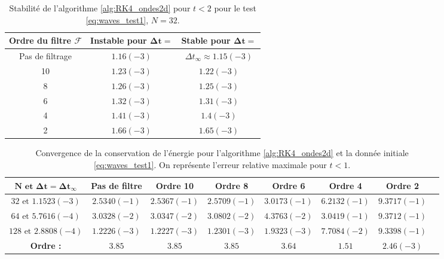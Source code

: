 \begin{table}[htbp]
\begin{center}
\begin{tabular}{|c||c|c|}
\hline
\textbf{Ordre du filtre} $\mathbf{\mathcal{F}}$  & \textbf{Instable pour} $\mathbf{\Delta t =}$ & \textbf{Stable pour} $\mathbf{\Delta t =}$ \\
\hline
\hline
Pas de filtrage & $1.16(-3)$ & $\Delta t_{\infty} \approx 1.15(-3)$\\
10 & $1.23(-3)$ & $1.22(-3)$ \\
8 & $1.26(-3)$ & $1.25(-3)$ \\
6 & $1.32(-3)$ & $1.31(-3)$ \\
4 & $1.41(-3)$ & $1.4(-3)$ \\
2 & $1.66(-3)$ & $1.65(-3)$ \\
\hline
\end{tabular}
\end{center}
\caption{Stabilité de l'algorithme \ref{alg:RK4_ondes2d} pour $t<2$ pour le test \eqref{eq:waves_test1}, $N=32$.}
\label{tab:dt_critique_waves}
\end{table} 
\begin{table}[htbp]
\begin{center}
\begin{tabular}{|c||c|c|c|c|c|c|c|}
\hline
$\mathbf{N \text{ et } \Delta t = \Delta t _{\infty}}$ & \textbf{Pas de filtre} & \textbf{Ordre 10} & \textbf{Ordre 8} & \textbf{Ordre 6} & \textbf{Ordre 4} & \textbf{Ordre 2}\\
\hline
$32\text{ et }1.1523(-3)$ & $2.5340(-1)$ & $2.5367(-1)$ & $2.5709(-1)$ & $3.0173(-1)$ & $6.2132(-1)$ & $9.3717(-1)$ \\
\hline
$64\text{ et }5.7616(-4)$ & $3.0328(-2)$ & $3.0347(-2)$ & $3.0802(-2)$ & $4.3763(-2)$ & $3.0419(-1)$ & $9.3712(-1)$ \\
\hline
$128\text{ et }2.8808(-4)$& $1.2226(-3)$ & $1.2227(-3)$ & $1.2301(-3)$ & $1.9323(-3)$ & $7.7084(-2)$ & $9.3398(-1)$ \\
\hline
\hline
\textbf{Ordre :} & $3.85$ & $3.85$ & $3.85$ & $3.64$ & $1.51$ & $2.46(-3)$ \\
\hline 
\end{tabular}
\end{center}
\caption{Convergence de la conservation de l'énergie pour l'algorithme \ref{alg:RK4_ondes2d} et la donnée initiale \eqref{eq:waves_test1}. On représente l'erreur relative maximale pour $t<1$.}
\label{tab:conservation_waves}
\end{table} 












